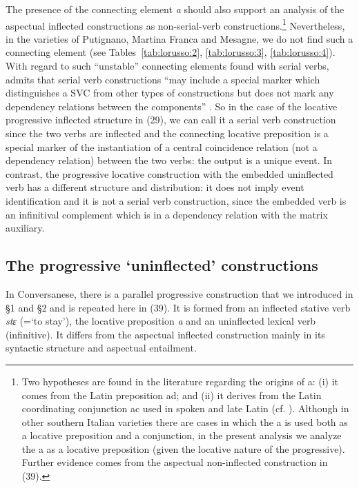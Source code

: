 \documentclass[output=paper]{langsci/langscibook}
\begin{document}
The presence of the connecting element \textit{a} should also support an analysis of the aspectual inflected constructions as non-serial-verb constructions.\footnote{Two hypotheses are found in the literature regarding the origins of a: (i) it comes from the Latin preposition ad; and (ii) it derives from the Latin coordinating conjunction ac used in spoken and late Latin (cf. \citealt[§§710,761]{Rohlfs1969}). Although in other southern Italian varieties there are cases in which the a is used both as a locative preposition and a conjunction, in the present analysis we analyze the a as a locative preposition (given the locative nature of the progressive). Further evidence comes from the aspectual non-inflected construction in (39).} Nevertheless, in the varieties of Putignano, Martina Franca and Mesagne, we do not find such a connecting element (see Tables~\ref{tab:lorusso:2}, \ref{tab:lorusso:3}, \ref{tab:lorusso:4}). With regard to such “unstable” connecting elements found with serial verbs, \citet{Aikhenvald2006} admits that serial verb constructions “may include a special marker which distinguishes a SVC from other types of constructions but does not mark any dependency relations between the components” \citep[20]{Aikhenvald2006}. So in the case of the locative progressive inflected structure in (29), we can call it a serial verb construction since the two verbs are inflected and the connecting locative preposition is a special marker of the instantiation of a central coincidence relation (not a dependency relation) between the two verbs: the output is a unique event. In contrast, the progressive locative construction with the embedded uninflected verb has a different structure and distribution: it does not imply event identification and it is not a serial verb construction, since the embedded verb is an infinitival complement which is in a dependency relation with the matrix auxiliary. 

\subsection{The progressive ‘uninflected’ constructions}%

In Conversanese, there is a parallel progressive construction that we introduced in §1 and §2 and is repeated here in (39). It is formed from an inflected stative verb \textit{stɛ} (=‘to stay’), the locative preposition \textit{a} and an uninflected lexical verb (infinitive). It differs from the aspectual inflected construction mainly in its syntactic structure and aspectual entailment. 
\end{document}
